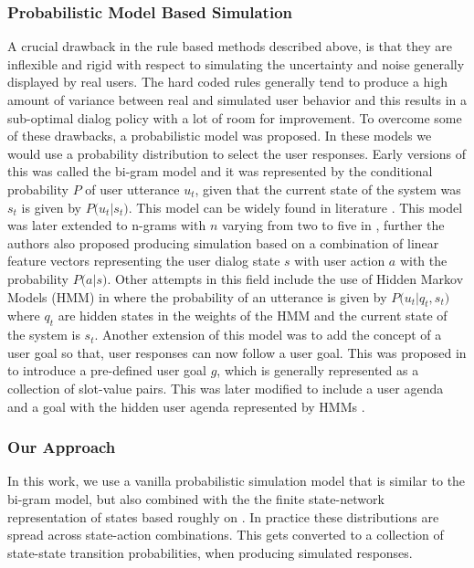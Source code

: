 \documentclass[14pt]{extarticle}
\numberwithin{equation}{section}
\begin{document}
	\subsubsection{Probabilistic Model Based Simulation}	
	A crucial drawback in the rule based methods described above, is that they are inflexible and rigid with respect to simulating the uncertainty and noise generally displayed by real users. The hard coded rules generally tend to produce a high amount of variance between real and simulated user behavior and this results in a sub-optimal dialog policy with a lot of room for improvement. To overcome some of these drawbacks, a probabilistic model was proposed. In these models we would use a probability distribution to select the user responses. Early versions of this was called the bi-gram model and it was represented by the conditional probability $P$ of user utterance $u_t$, given that the current state of the system was $s_t$ is given by $P\big(u_t|s_t\big)$. This model can be widely found in literature \cite{Cuayhuitl2006LearningMD}\cite{levin_mdp}\cite{4430164}. This model was later extended to n-grams with $n$ varying from two to five in \cite{Georgila2006UserSF}, further the authors also proposed producing simulation based on a combination of linear feature vectors representing the user dialog state $s$ with user action $a$ with the probability $P\big(a|s\big)$. Other attempts in this field include the use of Hidden Markov Models (HMM) in \cite{Cuayhuitl2005HumancomputerDS} where the probability of an utterance is given by $P\big(u_t|q_t,s_t\big)$ where $q_t$ are hidden states in the weights of the HMM and the current state of the system is $s_t$. Another extension of this model was to add the concept of a user goal so that, user responses can now follow a user goal. This was proposed in \cite{Scheffler_sim} to introduce a pre-defined user goal $g$, which is generally represented as a collection of slot-value pairs. This was later modified to include a user agenda and a goal with the hidden user agenda represented by HMMs \cite{Schatzmann2007StatisticalUS}.
	\subsubsection{Our Approach}
	In this work, we use a vanilla probabilistic simulation model that is similar to the bi-gram model, but also combined with the the finite state-network representation of states based roughly on \cite{Scheffler_sim}. In practice these distributions are spread across state-action combinations. This gets converted to a collection of state-state transition probabilities, when producing simulated responses.
\end{document}
